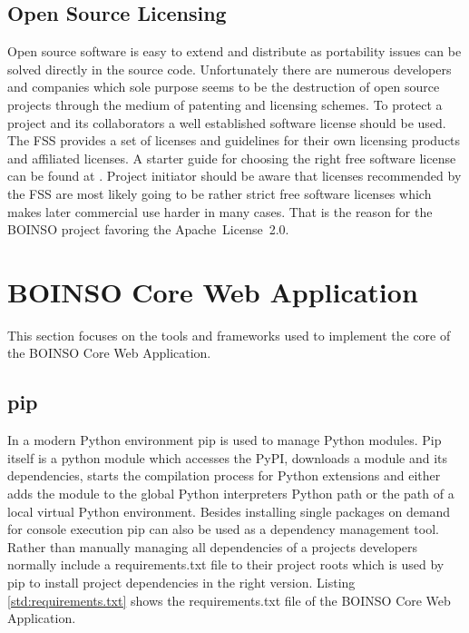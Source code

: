\documentclass[BachelorPaper]{subfiles}
\begin{document}


\subsection{Open Source Licensing}
\label{subsec:mat_licensing}
Open source software is easy to extend and distribute as portability issues can be solved directly in the source code. Unfortunately there are numerous developers and companies which sole purpose seems to be the destruction of open source projects through the medium of patenting and licensing schemes. To protect a project and its collaborators a well established software license should be used. The \ac{FSS} provides a set of licenses and guidelines for their own licensing products and affiliated licenses. A starter guide for choosing the right free software license can be found at \cite{fss_license_guide}. Project initiator should be aware that licenses recommended by the \ac{FSS} are most likely going to be rather strict free software licenses which makes later commercial use harder in many cases. That is the reason for the BOINSO project favoring the Apache~License~2.0.

\section{BOINSO Core Web Application}
\label{sec:mat_boinso_core}
This section focuses on the tools and frameworks used to implement the core of the BOINSO Core Web Application.

\subsection{pip}
\label{subsec:mat_pip}
In a modern Python environment pip is used to manage Python modules. Pip itself is a python module which accesses the \ac{PyPI}, downloads a module and its dependencies, starts the compilation process for Python extensions and either adds the module to the global Python interpreters Python path or the path of a local virtual Python environment. Besides installing single packages on demand for console execution pip can also be used as a dependency management tool. Rather than manually managing all dependencies of a projects developers normally include a requirements.txt file to their project roots which is used by pip to install project dependencies in the right version. Listing \ref{std:requirements.txt} shows the requirements.txt file of the BOINSO Core Web Application.\\
\end{document}
